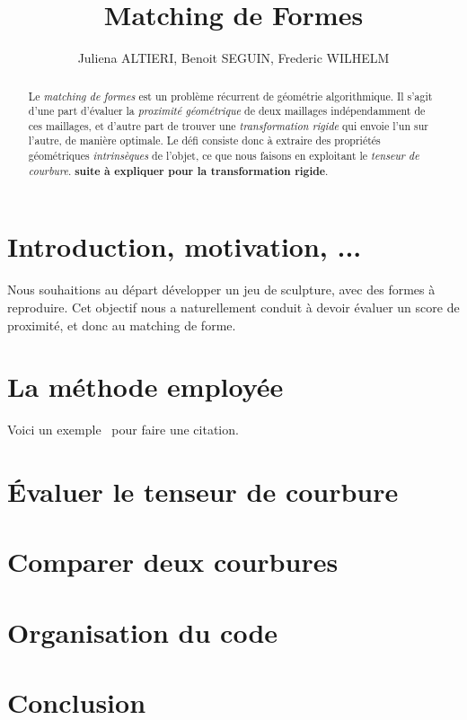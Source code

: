 \documentclass{llncs}
\begin{document}
\title{Matching de Formes}

\author{Juliena ALTIERI, Benoit SEGUIN, Frederic WILHELM}



\maketitle

\begin{abstract}
Le \textit{matching de formes} est un probl\`eme r\'ecurrent de g\'eom\'etrie algorithmique. Il s'agit d'une part d'\'evaluer la \textit{proximit\'e g\'eom\'etrique} de deux maillages ind\'ependamment de ces maillages, et d'autre part de trouver une \textit{transformation rigide} qui envoie l'un sur l'autre, de mani\`ere optimale. Le d\'efi consiste donc à extraire des propri\'et\'es g\'eom\'etriques \textit{intrins\`eques} de l'objet, ce que nous faisons en exploitant le \textit{tenseur de courbure}. \textbf{suite \`a expliquer pour la transformation rigide}.
\end{abstract}

\section{Introduction, motivation, ...}
Nous souhaitions au d\'epart d\'evelopper un jeu de sculpture, avec des formes \`a reproduire. Cet objectif nous a naturellement conduit \`a devoir \'evaluer un score de proximit\'e, et donc au matching de forme.






\section{La m\'ethode employ\'ee}
Voici un exemple~\cite{rugis} pour faire une citation.


\section{\'Evaluer le tenseur de courbure}


\section{Comparer deux courbures}


\section{Organisation du code}


\section{Conclusion}




\end{document}
